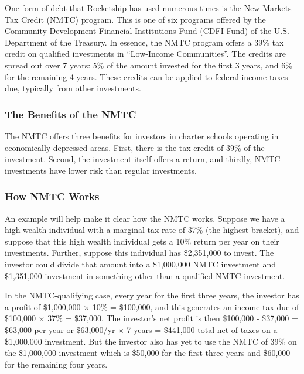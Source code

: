 One form of debt that Rocketship has used numerous times is the New Markets Tax Credit (NMTC) program. This is one of six programs offered by the Community Development Financial Institutions Fund (CDFI Fund) of the U.S. Department of the Treasury. In essence, the NMTC program offers a 39\% tax credit on qualified investments in ``Low-Income Communities''. The credits are spread out over 7 years: 5\% of the amount invested for the first 3 years, and 6\% for the remaining 4 years. These credits can be applied to federal income taxes due, typically from other investments.

\subsubsection{The Benefits of the NMTC}
\label{sec:nmtc-benefits}\indent%

The NMTC offers three benefits for investors in charter schools operating in economically depressed areas. First, there is the tax credit of 39\% of the investment. Second, the investment itself offers a return, and thirdly, NMTC investments have lower risk than regular investments.

\subsubsection{How NMTC Works}
\label{sec:how-nmtc-works}\indent%

An example will help make it clear how the NMTC works. Suppose we have a high wealth individual with a marginal tax rate of 37\% (the highest bracket), and suppose that this high wealth individual gets a 10\% return per year on their investments. Further, suppose this individual has \$2,351,000 to invest. The investor could divide that amount into a \$1,000,000 NMTC investment and \$1,351,000 investment in something other than a qualified NMTC investment.

In the NMTC-qualifying case, every year for the first three years, the investor has a profit of \$1,000,000 $\times$ 10\% = \$100,000, and this generates an income tax due of \$100,000 $\times$ 37\% = \$37,000. The investor's net profit is then \$100,000 - \$37,000 = \$63,000 per year or \$63,000/yr $\times$ 7 years = \$441,000 total net of taxes on a \$1,000,000 investment. But the investor also has yet to use the NMTC of 39\% on the \$1,000,000 investment which is \$50,000 for the first three years and \$60,000 for the remaining four years. 

